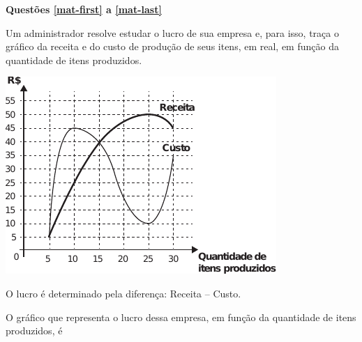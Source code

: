 \onecolumn
{}

\noindent\textbf{Questões \ref{mat-first} a \ref{mat-last}} %

\questao \label{mat-first} %
Um administrador resolve estudar o lucro de sua empresa e, para isso, traça o gráfico da receita 
e do custo de produção de seus itens, em real, em função da quantidade de itens produzidos.

\begin{center}
\includegraphics[width=.4\textwidth]{subareas/matematica/enem_2020-136-grafico.pdf}
\end{center}

O lucro é determinado pela diferença: Receita – Custo.

O gráfico que representa o lucro dessa empresa, em função da quantidade de itens produzidos, é

